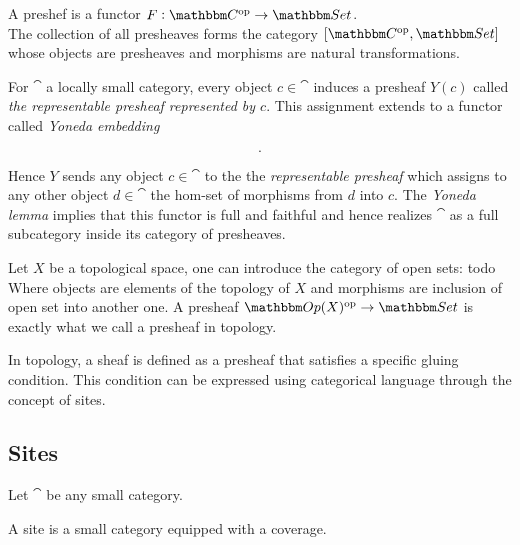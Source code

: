 \documentclass[a4paper,11pt,fleqn]{article}  %
\begin{document}
\begin{definition}
A preshef is a functor 
$ F: \cat^\op \to \Set$.
\\
The collection of all presheaves forms the category $[\cat^\op,\Set]$ whose objects are presheaves and morphisms are natural transformations.
\end{definition}

\begin{example}
For $\cat$ a locally small category, every object $c\in \cat$ induces a presheaf $Y(c)$ called \emph{the representable presheaf represented by $c$}.
This assignment extends to a functor called \emph{Yoneda embedding}

\begin{equation}
	.
\end{equation}

Hence $Y$ sends any object $c\in\cat$ to the the \emph{representable presheaf}\cite{nlab:representable_functor} which assigns to any other object $d \in \cat$ the hom-set of morphisms from $d$ into $c$.
The \emph{Yoneda lemma}\cite{nlab:yoneda_lemma} implies that this functor is full and faithful and hence realizes $\cat$ as a full subcategory inside its category of presheaves.
 
\end{example}

\begin{example}\label{ex:topolo-presheaf}
Let $X$ be a topological space, one can introduce the category of open sets:
%
	{todo}
%
Where objects are elements of the topology of $X$ and morphisms are inclusion of open set into another one.
A presheaf $\cat[Op](X)^\op \to \Set$ is exactly what we call a presheaf in topology.
\end{example}
In topology, a sheaf is defined as a presheaf that satisfies a specific gluing condition. This condition can be expressed using categorical language through the concept of sites.



\subsection{Sites}
Let $\cat$ be any small category.

\begin{definition}[Site]
	A site is a small category equipped with a coverage.
\end{definition}
\end{document}
